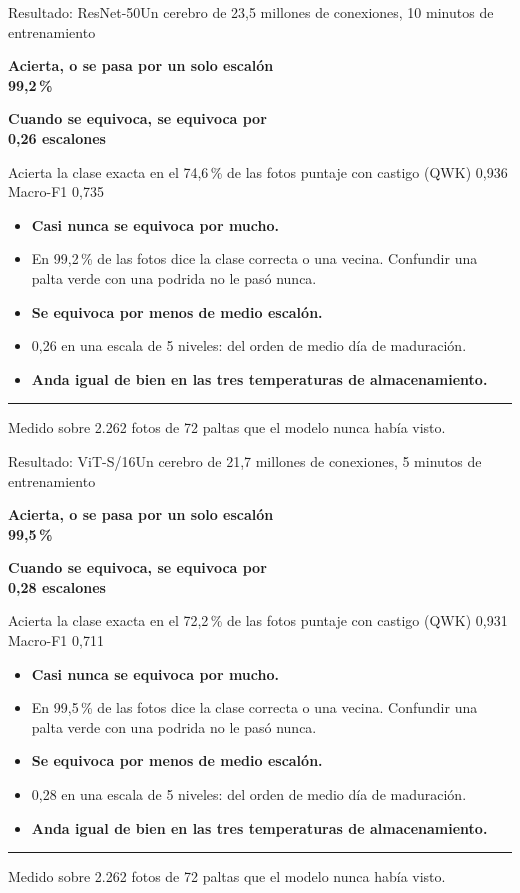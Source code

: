 \documentclass[aspectratio=169,11pt,table]{beamer}
\newcommand{\cierre}[1]{%
  \vfill
  {\color{verdecla}\rule{2.5pt}{0.9em}}\hspace{0.4em}%
  {\footnotesize\color{grisSuave}#1}%
}
\newcommand{\kpi}[4][verdeosc]{%
  \begin{minipage}[t]{#2}%
    \setlength{\fboxsep}{6pt}%
    \colorbox{grisFondo}{\begin{minipage}[t]{\dimexpr\linewidth-2\fboxsep-2\fboxrule\relax}%
      {\tiny\color{grisSuave}\bfseries #3}\\[0.12em]%
      {\large\bfseries\color{#1}#4}%
    \end{minipage}}%
  \end{minipage}%
}
\begin{document}
\begin{frame}{Resultado: ResNet-50}{Un cerebro de 23{,}5 millones de conexiones, 10 minutos de entrenamiento}
\kpi[azul]{0.47\textwidth}{Acierta, o se pasa por un solo escalón}{99{,}2\,\%}\hfill
\kpi[azul]{0.47\textwidth}{Cuando se equivoca, se equivoca por}{0{,}26 escalones}
\vspace{0.45em}
{\scriptsize\color{grisSuave}Acierta la clase exacta en el 74{,}6\,\% de las fotos \; \textbullet\; puntaje con castigo (QWK) 0{,}936 \; \textbullet\; Macro-F1 0{,}735}
\vspace{0.6em}
{\scriptsize
\setlength{\itemsep}{0.22em}
\begin{itemize}
  \item {\bfseries Casi nunca se equivoca por mucho.}
  \item En 99{,}2\,\% de las fotos dice la clase correcta o una vecina. Confundir una palta verde con una podrida no le pasó nunca.
  \item {\bfseries Se equivoca por menos de medio escalón.}
  \item 0{,}26 en una escala de 5 niveles: del orden de medio día de maduración.
  \item {\bfseries Anda igual de bien en las tres temperaturas de almacenamiento.}
\end{itemize}
}
\cierre{Medido sobre 2.262 fotos de 72 paltas que el modelo nunca había visto.}
\end{frame}

\begin{frame}{Resultado: ViT-S/16}{Un cerebro de 21{,}7 millones de conexiones, 5 minutos de entrenamiento}
\kpi[rojo]{0.47\textwidth}{Acierta, o se pasa por un solo escalón}{99{,}5\,\%}\hfill
\kpi[rojo]{0.47\textwidth}{Cuando se equivoca, se equivoca por}{0{,}28 escalones}
\vspace{0.45em}
{\scriptsize\color{grisSuave}Acierta la clase exacta en el 72{,}2\,\% de las fotos \; \textbullet\; puntaje con castigo (QWK) 0{,}931 \; \textbullet\; Macro-F1 0{,}711}
\vspace{0.6em}
{\scriptsize
\setlength{\itemsep}{0.22em}
\begin{itemize}
  \item {\bfseries Casi nunca se equivoca por mucho.}
  \item En 99{,}5\,\% de las fotos dice la clase correcta o una vecina. Confundir una palta verde con una podrida no le pasó nunca.
  \item {\bfseries Se equivoca por menos de medio escalón.}
  \item 0{,}28 en una escala de 5 niveles: del orden de medio día de maduración.
  \item {\bfseries Anda igual de bien en las tres temperaturas de almacenamiento.}
\end{itemize}
}
\cierre{Medido sobre 2.262 fotos de 72 paltas que el modelo nunca había visto.}
\end{frame}
\end{document}
